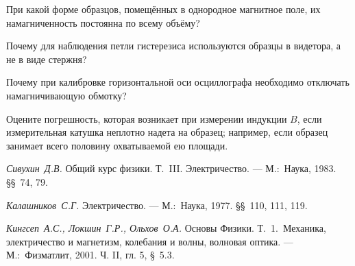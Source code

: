 \begin{lab:questions}
\item
При какой форме образцов, помещённых в однородное магнитное поле, их намагниченность постоянна по всему объёму?

\item
Почему для наблюдения петли гистерезиса используются образцы в видетора, а не в виде стержня?

\item
Почему при калибровке горизонтальной оси осциллографа необходимо от­ключать намагничивающую обмотку?

\item
Оцените погрешность, которая возникает при измерении индукции $B$, если измерительная катушка неплотно надета на образец; например, если образец занимает всего половину охватываемой ею площади.
\end{lab:questions}
\begin{lab:literature}
\item
\emph{Сивухин~Д.В.} Общий курс физики. Т.~III. Электричество. --- М.:~Наука, 1983. \S\S~74, 79.

\item
\emph{Калашников~С.Г.} Электричество. --- М.:~Наука, 1977. \S\S~110, 111, 119.

\item
\emph{Кингсеп~А.С., Локшин~Г.Р., Ольхов~О.А.} Основы Физики. Т.~1.~Механика, электричество и магнетизм, колебания и волны, волновая оптика. --- М.:~Физматлит, 2001. Ч. II, гл. 5, \S~5.3.
\end{lab:literature}